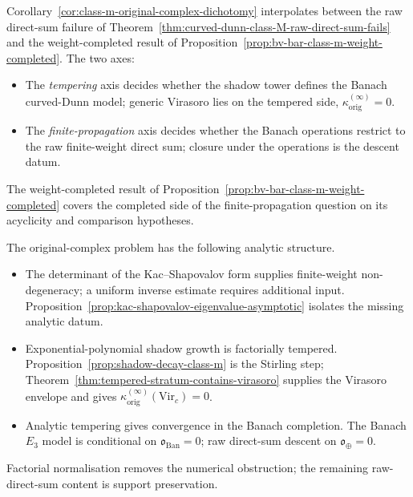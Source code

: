 \begin{remark}
\label{rem:relation-to-weight-completion-original}
Corollary~\ref{cor:class-m-original-complex-dichotomy} interpolates
between the raw direct-sum failure of
Theorem~\ref{thm:curved-dunn-class-M-raw-direct-sum-fails} and the
weight-completed result of
Proposition~\ref{prop:bv-bar-class-m-weight-completed}. The two axes:
\begin{itemize}
\item The \emph{tempering} axis decides whether the shadow tower
 defines the Banach curved-Dunn model; generic Virasoro lies on
 the tempered side, $\kappa^{(\infty)}_{\mathrm{orig}}=0$.
\item The \emph{finite-propagation} axis decides whether the Banach
 operations restrict to the raw finite-weight direct sum; closure
 under the operations is the descent datum.
\end{itemize}
The weight-completed result of
Proposition~\ref{prop:bv-bar-class-m-weight-completed} covers the
completed side of the finite-propagation question on its acyclicity and
comparison hypotheses.
\end{remark}

\begin{remark}
\label{rem:first-principles-summary-original-complex}
The original-complex problem has the following analytic structure.
\begin{itemize}
\item The determinant of the Kac--Shapovalov form supplies
 finite-weight non-degeneracy; a uniform inverse estimate requires
 additional input.
 Proposition~\ref{prop:kac-shapovalov-eigenvalue-asymptotic}
 isolates the missing analytic datum.
\item Exponential-polynomial shadow growth is factorially tempered.
 Proposition~\ref{prop:shadow-decay-class-m} is the Stirling step;
 Theorem~\ref{thm:tempered-stratum-contains-virasoro} supplies the
 Virasoro envelope and gives
 $\kappa^{(\infty)}_{\mathrm{orig}}(\mathrm{Vir}_c)=0$.
\item Analytic tempering gives convergence in the Banach completion.
 The Banach $E_3$ model is conditional on
 $\mathfrak{o}_{\mathrm{Ban}}=0$; raw direct-sum descent on
 $\mathfrak{o}_{\oplus}=0$.
\end{itemize}
Factorial normalisation removes the numerical obstruction; the
remaining raw-direct-sum content is support preservation.
\end{remark}

